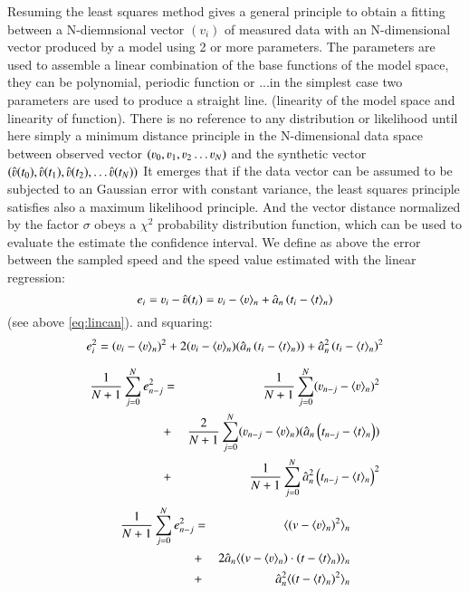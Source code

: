 Resuming the least squares method gives a general principle to obtain a fitting between a N-diemnsional vector $(v_i)$ of measured data with an N-dimensional vector produced by a model using 2 or more parameters. The parameters are used to assemble a linear combination of the base functions of the model space, they can be polynomial, periodic function or ...in the simplest case two parameters are used to produce a straight line. (linearity of the model space and linearity of function). There is no reference to any distribution or likelihood until here simply a minimum distance principle in the N-dimensional data space between observed vector $(\varv_0,\varv_1,\varv_2 \ldots \varv_N)$ and the synthetic vector $(\hat{\varv}(t_0),\hat{\varv}(t_1),\hat{\varv}(t_2),\ldots \hat{\varv}(t_N) )$
It emerges that if the data vector can be assumed to be subjected to an Gaussian error with constant variance, the least squares principle satisfies also a maximum likelihood principle. And the vector distance normalized by the factor $\sigma$ obeys a $\chi^2$ probability distribution function, which can be used to evaluate the  estimate the confidence interval. We define as above the error between the sampled speed and the speed value estimated with the linear regression:
\begin{equation}
e_i = \varv_i-\hat{\varv}(t_i) = \varv_i-\langle \varv \rangle_n + \hat{a}_n\left(t_i-\langle t \rangle_n\right)
\end{equation}
(see above \ref{eq:lincan}). and squaring:
\begin{equation}
e^2_i=(\varv_i-\langle \varv \rangle_n)^2+ 2(\varv_i-\langle \varv \rangle_n )(\hat{a}_n\left(t_i-\langle t \rangle_n\right)) + \hat{a}_n^2\left(t_i-\langle t \rangle_n\right)^2
\end{equation}

\begin{eqnarray}
\frac{1}{N+1}\sum\limits_{j=0}^{N}e^2_{n-j}&=&\frac{1}{N+1}\sum\limits_{j=0}^{N}(\varv_{n-j}-\langle \varv \rangle_n)^2\nonumber \\
&+& \frac{2}{N+1}\sum\limits_{j=0}^{N}(\varv_{n-j}-\langle \varv \rangle_n )(\hat{a}_n\left(t_{n-j}-\langle t \rangle_n\right))\nonumber \\ 
&+&\frac{1}{N+1}\sum\limits_{j=0}^{N}\hat{a}_n^2\left(t_{n-j}-\langle t \rangle_n\right)^2
\end{eqnarray}
\begin{eqnarray}
\frac{1}{N+1}\sum\limits_{j=0}^{N}e^2_{n-j}&=&\langle (v-\langle \varv \rangle_n)^2\rangle_n \nonumber \\
&+& 2\hat{a}_n\langle \left(v-\langle \varv \rangle_n \right)\cdot \left(t-\langle t \rangle_n\right)\rangle_n \nonumber \\ 
&+&\hat{a}_n^2\langle \left(t-\langle t \rangle_n\right)^2\rangle_n
\end{eqnarray}
  
